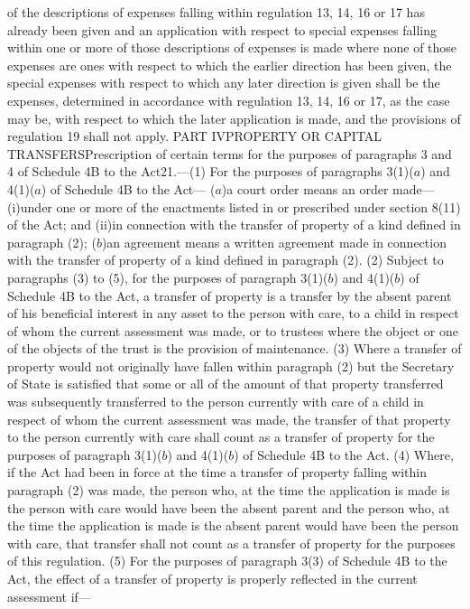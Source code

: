 \documentclass[a4paper]{article}
\begin{document}
of the descriptions of expenses falling within regulation 13, 14, 16 or 17 has
already been given and an application with respect to special expenses falling
within one or more of those descriptions of expenses is made where none of those
expenses are ones with respect to which the earlier direction has been given,
the special expenses with respect to which any later direction is given shall be
the expenses, determined in accordance with regulation 13, 14, 16 or 17, as the
case may be, with respect to which the later application is made, and the
provisions of regulation 19 shall not apply.
PART IVPROPERTY OR CAPITAL TRANSFERSPrescription of certain terms for the
purposes of paragraphs 3 and 4 of Schedule 4B to the Act21.—(1) For the purposes
of paragraphs 3(1)($a$) and 4(1)($a$) of Schedule 4B to the Act—
($a$)a court order means an order made—
(i)under one or more of the enactments listed in or prescribed under section
8(11) of the Act; and
(ii)in connection with the transfer of property of a kind defined in paragraph
(2);
($b$)an agreement means a written agreement made in connection with the transfer
of property of a kind defined in paragraph (2).
(2) Subject to paragraphs (3) to (5), for the purposes of paragraph 3(1)($b$) and
4(1)($b$) of Schedule 4B to the Act, a transfer of property is a transfer by the
absent parent of his beneficial interest in any asset to the person with care,
to a child in respect of whom the current assessment was made, or to trustees
where the object or one of the objects of the trust is the provision of
maintenance.
(3) Where a transfer of property would not originally have fallen within
paragraph (2) but the Secretary of State is satisfied that some or all of the
amount of that property transferred was subsequently transferred to the person
currently with care of a child in respect of whom the current assessment was
made, the transfer of that property to the person currently with care shall
count as a transfer of property for the purposes of paragraph 3(1)($b$) and
4(1)($b$) of Schedule 4B to the Act.
(4) Where, if the Act had been in force at the time a transfer of property
falling within paragraph (2) was made, the person who, at the time the
application is made is the person with care would have been the absent parent
and the person who, at the time the application is made is the absent parent
would have been the person with care, that transfer shall not count as a
transfer of property for the purposes of this regulation.
(5) For the purposes of paragraph 3(3) of Schedule 4B to the Act, the effect of
a transfer of property is properly reflected in the current assessment if—
\end{document}
